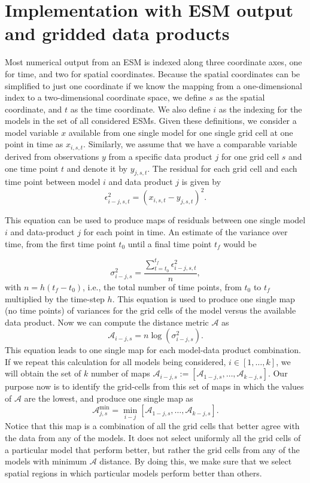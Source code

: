 \documentclass[gmd, manuscript]{copernicus}
\begin{document}
\section{Implementation with ESM output and gridded data products}
Most numerical output from an ESM is indexed along three coordinate axes, one for time, and two for spatial coordinates. Because the spatial coordinates can be simplified to just one coordinate if we know the mapping from a one-dimensional index to a two-dimensional coordinate space, we define $s$ as the spatial coordinate, and $t$ as the time coordinate. We also define $i$ as the indexing for the models in the set of all considered ESMs. Given these definitions, we consider a model variable $x$ available from one single model for one single grid cell at one point in time as $x_{i, s, t}$. Similarly, we assume that we have a comparable variable derived from observations $y$ from a specific data product $j$ for one grid cell $s$ and one time point $t$ and denote it by $y_{j, s, t}$. The residual for each grid cell and each time point between model $i$ and data product $j$ is given by
\begin{equation}
\epsilon_{i-j, s, t}^2 =  (x_{i, s, t} - y_{j, s, t})^2.
\end{equation}

This equation can be used to produce maps of residuals between one single model $i$ and data-product $j$ for each point in time. An estimate of the variance over time, from the first time point $t_0$ until a final time point $t_f$ would be

\begin{equation}
\sigma_{i-j, s}^2 = \frac{ \sum_{t=t_0}^{t_f} \epsilon_{i-j, s, t}^2 }{n},
\end{equation}
with $n = h (t_f - t_0)$, i.e., the total number of time points, from $t_0$ to $t_f$ multiplied by the time-step $h$. This equation is used to produce one single map (no time points) of variances for the grid cells of the model versus the available data product. Now we can compute  the distance metric $\mathcal{A}$ as
\begin{equation}
\mathcal{A}_{i-j, s} = n \log (\sigma_{i-j, s}^2).
\end{equation}
This equation leads to one single map for each model-data product combination. If we repeat this calculation for all models being considered, $i \in [1, \dots , k]$, we will obtain the set of $k$ number of maps $\mathcal{A}_{i-j, s} := [\mathcal{A}_{1-j, s}, \dots , \mathcal{A}_{k-j, s}] $. Our purpose now is to identify the grid-cells from this set of maps in which the values of $\mathcal{A}$ are the lowest, and produce one single map as
\begin{equation}
\mathcal{A}_{j, s}^{\min} = \min_{i-j} [\mathcal{A}_{1-j, s}, \dots , \mathcal{A}_{k-j, s}].
\end{equation}
Notice that this map is a combination of all the grid cells that better agree with the data from any of the models. It does not select uniformly all the grid cells of a particular model that perform better, but rather the grid cells from any of the models with minimum $\mathcal{A}$ distance. By doing this, we make sure that we select spatial regions in which particular models perform better than others.
\end{document}
